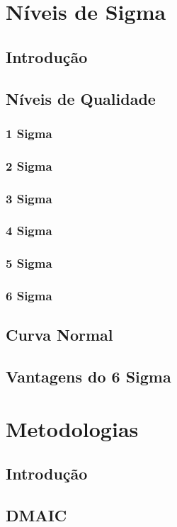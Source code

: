 \documentclass{abnt}
\begin{document}
	\chapter {Níveis de Sigma}
		\section {Introdução}
		\section {Níveis de Qualidade}
			\subsection {1 Sigma}
			\subsection {2 Sigma}
			\subsection {3 Sigma}
			\subsection {4 Sigma}
			\subsection {5 Sigma}
			\subsection {6 Sigma}
		\section {Curva Normal}	
		\section {Vantagens do 6 Sigma}
				
	\chapter {Metodologias}
		\section {Introdução}
			\section {DMAIC}
\end{document}
